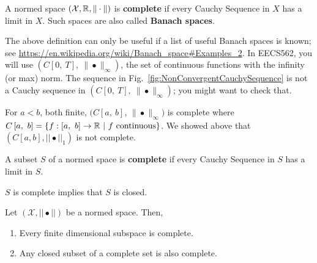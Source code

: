 \begin{definition} A normed space $(\mathcal{X},\mathbb R,\|\cdot\|)$ is \textbf{complete} if every Cauchy Sequence in $X$ has a limit in $X$. Such spaces are also called \textbf{ Banach spaces}.
\end{definition} 

The above definition can only be useful if a list of useful Banach spaces is known; see \url{https://en.wikipedia.org/wiki/Banach_space#Examples_2}.   In EECS562, you will use $\left(C\left[0,\ T\right],\ \| \bullet \|_\infty\right)$, the set of continuous functions with the infinity (or max) norm. The sequence in Fig.~\ref{fig:NonConvergentCauchySequence} is not a Cauchy sequence in $\left(C\left[0,\ T\right],\ \| \bullet \|_\infty\right)$; you might want to check that.

\begin{fact} For $a<b$, both finite, $(C\left[a,\ b\right]$, $\| \bullet \|_\infty)$ is complete where $C\left[a,\ b\right]=\left\{f:\left[a,\ b\right]\to\real\ |\ f\textnormal{ continuous}\right\}$. We showed above that $(C[a, b], ||\bullet||_1)$ is not complete.
\end{fact}


\begin{definition} A subset $S$ of a normed space is \textbf{ complete} if every Cauchy Sequence in $S$ has a limit in $S$.

\end{definition} 

\begin{rem} $S$ is complete implies that $S$ is closed.
    
\end{rem}

\begin{thm} Let $(\mathcal{X}, || \bullet ||)$ be a normed space. Then,

\begin{enumerate} 
       \renewcommand{\labelenumi}{(\alph{enumi})}
        \setlength{\itemsep}{.1cm}
        \item Every finite dimensional subspace is complete.
        \item Any closed subset of a complete set is also complete.
    \end{enumerate}
\end{thm}


